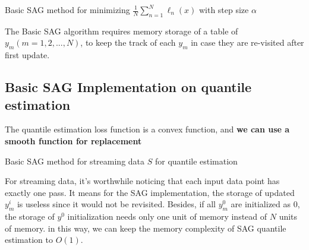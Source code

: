 \begin{algorithm}
    \caption{Basic SAG method for minimizing $\frac{1}{N} \sum^N_{n=1}\ell_n(x)$ with step size $\alpha$}\label{alg:SAG_ori}
        \begin{algorithmic}[1]
                       
                                    
            \EndFor
        \end{algorithmic}
\end{algorithm}

The Basic SAG algorithm requires memory storage of a table of $y_m (m= 1, 2, ...,N)$, to keep the track of each $y_m$ in case they are re-visited after first update.

\subsection{Basic SAG Implementation on quantile estimation}

The quantile estimation loss function is a convex function, and \textbf{we can use a smooth function for replacement}
\begin{algorithm}
    \caption{Basic SAG method for streaming data $S$ for quantile estimation}\label{alg:SAG}
        \begin{algorithmic}[1]
                       
                 
            \EndFor
        \end{algorithmic}
\end{algorithm}
For streaming data, it's worthwhile noticing that each input data point has exactly one pass. It means for the SAG implementation, the storage of updated $y_m^i$ is useless since it would not be revisited. Besides, if all $y_m^0$ are initialized as 0, the storage of $y^0$ initialization needs only one unit of memory instead of $N$ units of memory. in this way, we can keep the memory complexity of SAG quantile estimation to $O(1)$.

